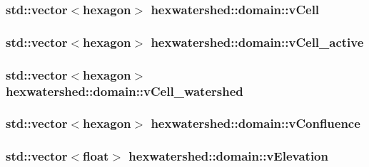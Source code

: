 \hypertarget{classhexwatershed_1_1domain_a335b042f837bb1d5bf6494e1b28ce502}{
\subsubsection[{v\-Cell}]{\setlength{\rightskip}{0pt plus 5cm}std\-::vector$<${\bf hexagon}$>$ hexwatershed\-::domain\-::v\-Cell}}\label{classhexwatershed_1_1domain_a335b042f837bb1d5bf6494e1b28ce502}
\hypertarget{classhexwatershed_1_1domain_ae83f1884f6afd8f5a98848e93f3507ea}{
\subsubsection[{v\-Cell\-\_\-active}]{\setlength{\rightskip}{0pt plus 5cm}std\-::vector$<${\bf hexagon}$>$ hexwatershed\-::domain\-::v\-Cell\-\_\-active}}\label{classhexwatershed_1_1domain_ae83f1884f6afd8f5a98848e93f3507ea}
\hypertarget{classhexwatershed_1_1domain_a5087da3221f695d12d0659d779e41e2c}{
\subsubsection[{v\-Cell\-\_\-watershed}]{\setlength{\rightskip}{0pt plus 5cm}std\-::vector$<${\bf hexagon}$>$ hexwatershed\-::domain\-::v\-Cell\-\_\-watershed}}\label{classhexwatershed_1_1domain_a5087da3221f695d12d0659d779e41e2c}
\hypertarget{classhexwatershed_1_1domain_a7fe968d507aa3f6225f2890b1ed12ff0}{
\subsubsection[{v\-Confluence}]{\setlength{\rightskip}{0pt plus 5cm}std\-::vector$<${\bf hexagon}$>$ hexwatershed\-::domain\-::v\-Confluence}}\label{classhexwatershed_1_1domain_a7fe968d507aa3f6225f2890b1ed12ff0}
\hypertarget{classhexwatershed_1_1domain_a534b3cf5bff1f923373c187ca9d0db08}{
\subsubsection[{v\-Elevation}]{\setlength{\rightskip}{0pt plus 5cm}std\-::vector$<$float$>$ hexwatershed\-::domain\-::v\-Elevation}}\label{classhexwatershed_1_1domain_a534b3cf5bff1f923373c187ca9d0db08}
